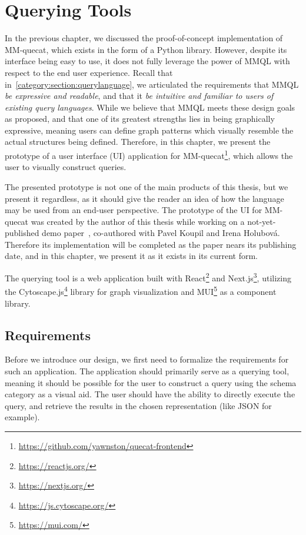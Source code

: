 \chapter{Querying Tools}
\label{querytools}

In the previous chapter, we discussed the proof-of-concept implementation of MM-quecat, which exists in the form of a Python library.
However, despite its interface being easy to use, it does not fully leverage the power of MMQL with respect to the end user experience.
Recall that in~\cref{category:section:querylanguage}, we articulated the requirements that MMQL \textit{be expressive and readable}, and that it \textit{be intuitive and familiar to users of existing query languages}.
While we believe that MMQL meets these design goals as proposed, and that one of its greatest strengths lies in being graphically expressive, meaning users can define graph patterns which visually resemble the actual structures being defined.
Therefore, in this chapter, we present the prototype of a user interface (UI) application for MM-quecat\footnote{\url{https://github.com/yawnston/quecat-frontend}}, which allows the user to visually construct queries.

The presented prototype is not one of the main products of this thesis, but we present it regardless, as it should give the reader an idea of how the language may be used from an end-user perspective.
The prototype of the UI for MM-quecat was created by the author of this thesis while working on a not-yet-published demo paper~\cite{mm_quecat}, co-authored with Pavel Koupil and Irena Holubov{\'a}.
Therefore its implementation will be completed as the paper nears its publishing date, and in this chapter, we present it as it exists in its current form.

The querying tool is a web application built with React\footnote{\url{https://reactjs.org/}} and Next.js\footnote{\url{https://nextjs.org/}}, utilizing the Cytoscape.js\footnote{\url{https://js.cytoscape.org/}} library for graph visualization and MUI\footnote{\url{https://mui.com/}} as a component library.

\section{Requirements}

Before we introduce our design, we first need to formalize the requirements for such an application.
The application should primarily serve as a querying tool, meaning it should be possible for the user to construct a query using the schema category as a visual aid.
The user should have the ability to directly execute the query, and retrieve the results in the chosen representation (like JSON for example).

